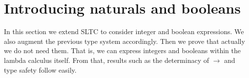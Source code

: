 \section{Introducing naturals and booleans}

In this section we extend SLTC to consider integer and boolean expressions. We also augment the previous type system accordingly. Then we prove that actually we do not need them. That is, we can express integers and booleans within the lambda calculus itself. From that, results such as the determinacy of $\to$ and type safety follow easily. 